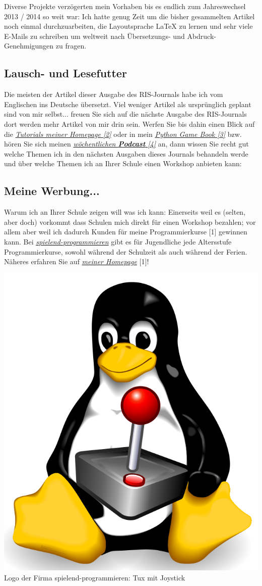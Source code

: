 Diverse Projekte verzögerten mein Vorhaben bis es endlich zum Jahreswechsel 2013 / 2014 so weit war: Ich hatte genug Zeit um die bisher gesammelten Artikel noch einmal durchzuarbeiten, die Layoutsprache {\large \LaTeX} zu lernen und sehr viele E-Mails zu schreiben um weltweit nach Übersetzungs- und Abdruck-Genehmigungen zu fragen. 

\subsection*{Lausch- und Lesefutter}
Die meisten der Artikel dieser Ausgabe des RIS-Journals habe ich vom Englischen ins Deutsche übersetzt. Viel weniger Artikel als ursprünglich geplant sind von mir selbst... freuen Sie sich auf die nächste Ausgabe des RIS-Journals dort werden mehr Artikel von mir drin sein. Werfen Sie bis dahin einen Blick auf die \href{http://spielend-programmieren.at/de:tutorials:start}{\textit{Tutorials meiner Homepage [2]}} oder in mein \href{http://thepythongamebook.com}{\textit{Python Game Book [3]}} bzw. hören Sie sich meinen \href{http://biertaucher.at}{\textit{wöchentlichen \textbf{Podcast} [4]}} an, dann wissen Sie recht gut welche Themen ich in den nächsten Ausgaben dieses Journals behandeln werde und über welche Themen ich an Ihrer Schule einen Workshop anbieten kann:

\subsection*{Meine Werbung...}
Warum ich an Ihrer Schule zeigen will was ich kann: Einerseits weil es (selten, aber doch) vorkommt dass Schulen mich direkt für einen Workshop bezahlen; vor allem aber weil ich dadurch Kunden für meine Programmierkurse [1] gewinnen kann. Bei \href{http://spielend-programmieren.at}{\textit{spielend-programmieren}} gibt es für Jugendliche jede Altersstufe Programmierkurse, sowohl während der Schulzeit als auch während der Ferien. Näheres erfahren Sie auf \href{http://spielend-programmieren.at}{\textit{meiner Homepage}} [1]!

\begin{center}
\includegraphics[width=0.5\linewidth]{editoral/editoral-tuxstick3.png}\\
\footnotesize{Logo der Firma spielend-programmieren: Tux mit Joystick}
\end{center}

